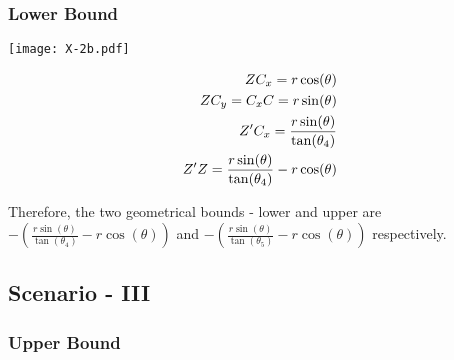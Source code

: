 \subsubsection{Lower Bound}

\begin{minipage}[t]{0.5\textwidth}
\texttt{[image: X-2b.pdf]} 
\end{minipage}
\begin{minipage}[t]{0.5\textwidth}
\vspace{-2in}
\begin{equation*}
\centering
\begin{aligned}
ZC_x = r\cos(\theta) \\
ZC_y =  C_{x}C = r\sin(\theta) \\
Z'C_x =\frac{r\sin(\theta)}{\tan(\theta_4)}\\
Z'Z = \frac{r\sin(\theta)}{\tan(\theta_4)} - r\cos(\theta)\\
\end{aligned}
\end{equation*}
\end{minipage}


Therefore, the two geometrical bounds - lower and upper are $-(\frac{r\sin(\theta)}{\tan(\theta_4)} - r\cos(\theta))$ and $-(\frac{r\sin(\theta)}{\tan(\theta_5)} - r\cos(\theta))$ respectively.


\subsection{Scenario - III}

\subsubsection{Upper Bound}

